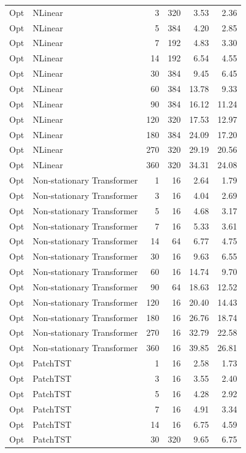 {\begin{longtable}{llrrrr}
Opt & NLinear & 3 & 320 & 3.53 & 2.36 \\
Opt & NLinear & 5 & 384 & 4.20 & 2.85 \\
Opt & NLinear & 7 & 192 & 4.83 & 3.30 \\
Opt & NLinear & 14 & 192 & 6.54 & 4.55 \\
Opt & NLinear & 30 & 384 & 9.45 & 6.45 \\
Opt & NLinear & 60 & 384 & 13.78 & 9.33 \\
Opt & NLinear & 90 & 384 & 16.12 & 11.24 \\
Opt & NLinear & 120 & 320 & 17.53 & 12.97 \\
Opt & NLinear & 180 & 384 & 24.09 & 17.20 \\
Opt & NLinear & 270 & 320 & 29.19 & 20.56 \\
Opt & NLinear & 360 & 320 & 34.31 & 24.08 \\
Opt & Non-stationary Transformer & 1 & 16 & 2.64 & 1.79 \\
Opt & Non-stationary Transformer & 3 & 16 & 4.04 & 2.69 \\
Opt & Non-stationary Transformer & 5 & 16 & 4.68 & 3.17 \\
Opt & Non-stationary Transformer & 7 & 16 & 5.33 & 3.61 \\
Opt & Non-stationary Transformer & 14 & 64 & 6.77 & 4.75 \\
Opt & Non-stationary Transformer & 30 & 16 & 9.63 & 6.55 \\
Opt & Non-stationary Transformer & 60 & 16 & 14.74 & 9.70 \\
Opt & Non-stationary Transformer & 90 & 64 & 18.63 & 12.52 \\
Opt & Non-stationary Transformer & 120 & 16 & 20.40 & 14.43 \\
Opt & Non-stationary Transformer & 180 & 16 & 26.76 & 18.74 \\
Opt & Non-stationary Transformer & 270 & 16 & 32.79 & 22.58 \\
Opt & Non-stationary Transformer & 360 & 16 & 39.85 & 26.81 \\
Opt & PatchTST & 1 & 16 & 2.58 & 1.73 \\
Opt & PatchTST & 3 & 16 & 3.55 & 2.40 \\
Opt & PatchTST & 5 & 16 & 4.28 & 2.92 \\
Opt & PatchTST & 7 & 16 & 4.91 & 3.34 \\
Opt & PatchTST & 14 & 16 & 6.75 & 4.59 \\
Opt & PatchTST & 30 & 320 & 9.65 & 6.75 \\

\end{longtable}}

